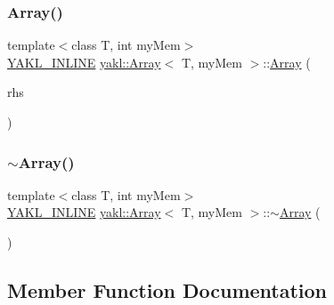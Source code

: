 \mbox{\label{classyakl_1_1Array_ab0fa8146f38f9cf8a89240b781b2d4b6}} 
\subsubsection{\texorpdfstring{Array()}{Array()}\hspace{0.1cm}{\footnotesize\ttfamily [12/12]}}
{\footnotesize\ttfamily template$<$class T, int my\+Mem$>$ \\
\hyperlink{YAKL_8h_aa0dd629ffce6d564b19e9313fb91a5ad}{Y\+A\+K\+L\+\_\+\+I\+N\+L\+I\+NE} \hyperlink{classyakl_1_1Array}{yakl\+::\+Array}$<$ T, my\+Mem $>$\+::\hyperlink{classyakl_1_1Array}{Array} (\begin{DoxyParamCaption}\item[{\hyperlink{classyakl_1_1Array}{Array}$<$ T, my\+Mem $>$ \&\&}]{rhs }\end{DoxyParamCaption})\hspace{0.3cm}{\ttfamily [inline]}}

\mbox{\label{classyakl_1_1Array_ad678067305bc1488877f49362c6eb0f6}} 
\subsubsection{\texorpdfstring{$\sim$\+Array()}{~Array()}}
{\footnotesize\ttfamily template$<$class T, int my\+Mem$>$ \\
\hyperlink{YAKL_8h_aa0dd629ffce6d564b19e9313fb91a5ad}{Y\+A\+K\+L\+\_\+\+I\+N\+L\+I\+NE} \hyperlink{classyakl_1_1Array}{yakl\+::\+Array}$<$ T, my\+Mem $>$\+::$\sim$\hyperlink{classyakl_1_1Array}{Array} (\begin{DoxyParamCaption}{ }\end{DoxyParamCaption})\hspace{0.3cm}{\ttfamily [inline]}}



\subsection{Member Function Documentation}
\mbox{\label{classyakl_1_1Array_a81e69ab3f8c44bf08740b941cc30d417}} 
